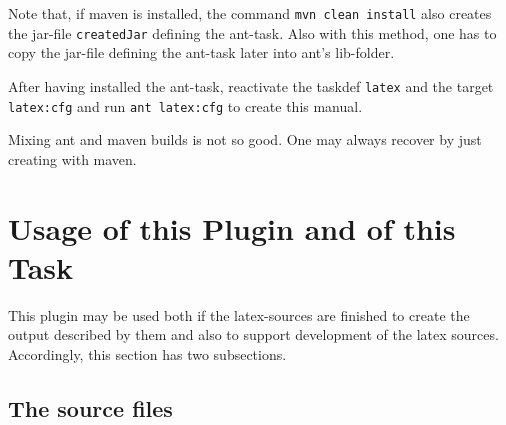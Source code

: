 \documentclass[12pt]{article}
\begin{document}
Note that, if maven is installed, the command {\tt mvn clean install} 
also creates the jar-file {\tt createdJar} defining the ant-task. 
Also with this method, one has to copy the jar-file defining the ant-task 
later into ant's lib-folder. 

After having installed the ant-task, 
reactivate the taskdef {\tt latex} and the target {\tt latex:cfg} 
and run {\tt ant latex:cfg} to create this manual. 

Mixing ant and maven builds is not so good. 
One may always recover by just creating with maven. 



\section{Usage of this Plugin and of this Task}\label{sec:usage}

This plugin may be used both if the latex-sources are finished 
to create the output described by them 
and also to support development of the latex sources. 
Accordingly, this section has two subsections. 

\subsection{The source files}\label{subsec:sources}
\end{document}
